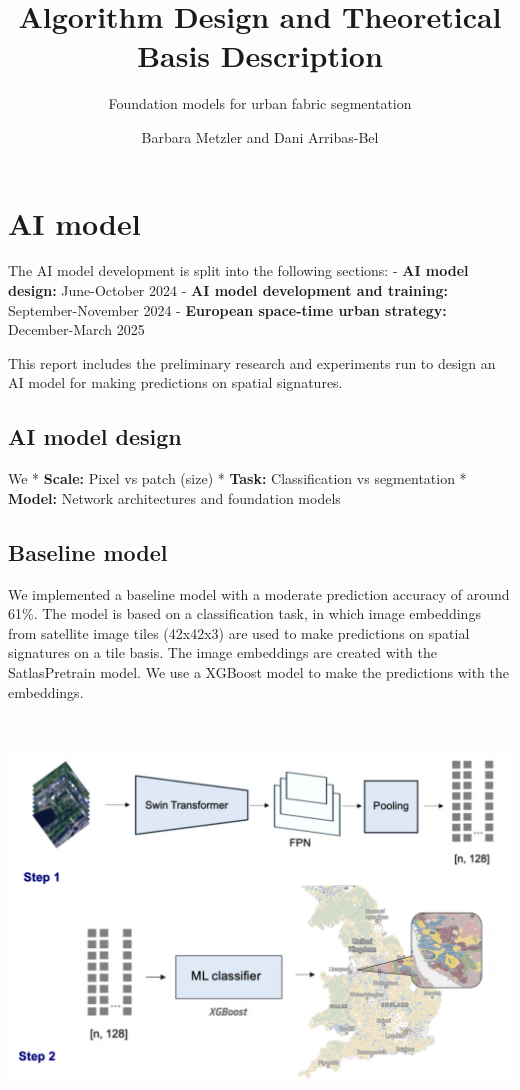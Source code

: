 \documentclass[
  letterpaper,
  DIV=11,
  numbers=noendperiod]{scrartcl}
\title{Algorithm Design and Theoretical Basis Description}
\subtitle{Foundation models for urban fabric segmentation}
\author{Barbara Metzler and Dani Arribas-Bel}
\date{}
\renewcommand*\contentsname{Table of contents}
\newcommand\contentsname{Table of contents}
\begin{document}
\maketitle

\renewcommand*\contentsname{Table of contents}
{
\hypersetup{linkcolor=}
\setcounter{tocdepth}{3}
\tableofcontents
}
\section{AI model}\label{ai-model}

The AI model development is split into the following sections: -
\textbf{AI model design:} June-October 2024 - \textbf{AI model
development and training:} September-November 2024 - \textbf{European
space-time urban strategy:} December-March 2025

This report includes the preliminary research and experiments run to
design an AI model for making predictions on spatial signatures.

\subsection{AI model design}\label{ai-model-design}

We * \textbf{Scale:} Pixel vs patch (size) * \textbf{Task:}
Classification vs segmentation * \textbf{Model:} Network architectures
and foundation models

\subsection{Baseline model}\label{baseline-model}

We implemented a baseline model with a moderate prediction accuracy of
around 61\%. The model is based on a classification task, in which image
embeddings from satellite image tiles (42x42x3) are used to make
predictions on spatial signatures on a tile basis. The image embeddings
are created with the SatlasPretrain model. We use a XGBoost model to
make the predictions with the embeddings.

\begin{center}
\includegraphics[width=\textwidth,height=4.16667in]{../figures/algo_design/baseline.png}
\end{center}
\end{document}
